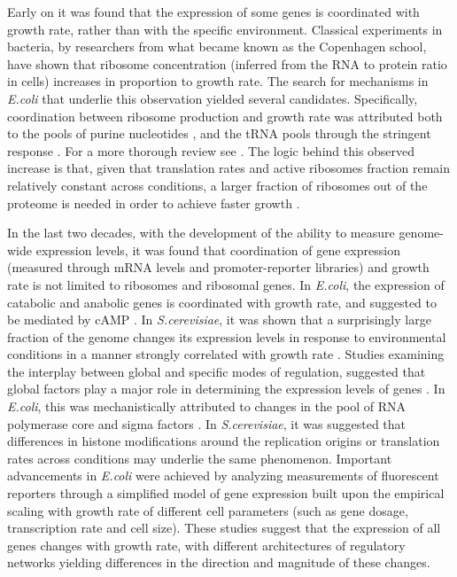 \documentclass[notitlepage]{article}
\begin{document}
Early on it was found that the expression of some genes is coordinated with growth rate, rather than with the specific environment.
Classical experiments in bacteria, by researchers from what became known as the Copenhagen school, have shown that ribosome concentration (inferred from the RNA to protein ratio in cells) increases in proportion to growth rate\cite{Schaechter1958}.
The search for mechanisms in \emph{E.coli} that underlie this observation yielded several candidates.
Specifically, coordination between ribosome production and growth rate was attributed both to the pools of purine nucleotides \cite{Gourse1996,Gaal1997}, and the tRNA pools through the stringent response \cite{Chatterji2001,Brauer2008a}.
For a more thorough review see \cite{Nomura1984}.
The logic behind this observed increase is that, given that translation rates and active ribosomes fraction remain relatively constant across conditions, a larger fraction of ribosomes out of the proteome is needed in order to achieve faster growth \cite{neidhardt1999a,dennis2004,Zaslaver2009}.

In the last two decades, with the development of the ability to measure genome-wide expression levels, it was found that coordination of gene expression (measured through mRNA levels and promoter-reporter libraries) and growth rate is not limited to ribosomes and ribosomal genes.
In \emph{E.coli}, the expression of catabolic and anabolic genes is coordinated with growth rate, and suggested to be mediated by cAMP \cite{Saldanha2004}.
In \emph{S.cerevisiae}, it was shown that a surprisingly large fraction of the genome changes its expression levels in response to environmental conditions in a manner strongly correlated with growth rate \cite{Keren2013a,Gasch2000,Castrillo2007,Zaslaver2009, Gerosa2013}.
Studies examining the interplay between global and specific modes of regulation, suggested that global factors play a major role in determining the expression levels of genes \cite{Gasch2000, Klumpp2009a,Scott2010, Berthoumieux2013}.
In \emph{E.coli}, this was mechanistically attributed to changes in the pool of RNA polymerase core and sigma factors \cite{Klumpp2008}.
In \emph{S.cerevisiae}, it was suggested that differences in histone modifications around the replication origins \cite{regenberg2006} or translation rates \cite{Gasch2000} across conditions may underlie the same phenomenon.
Important advancements in \emph{E.coli} were achieved by analyzing measurements of fluorescent reporters through a simplified model of gene expression built upon the empirical scaling with growth rate of different cell parameters (such as gene dosage, transcription rate and cell size)\cite{Klumpp2009a}.
These studies suggest that the expression of all genes changes with growth rate, with different architectures of regulatory networks yielding differences in the direction and magnitude of these changes. 
\end{document}

